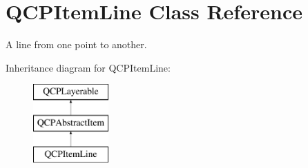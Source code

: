\hypertarget{classQCPItemLine}{\section{\-Q\-C\-P\-Item\-Line \-Class \-Reference}
\label{classQCPItemLine}
}


\-A line from one point to another.  


\-Inheritance diagram for \-Q\-C\-P\-Item\-Line\-:\begin{figure}[H]
\begin{center}
\leavevmode
\includegraphics[height=3.000000cm]{classQCPItemLine}
\end{center}
\end{figure}
